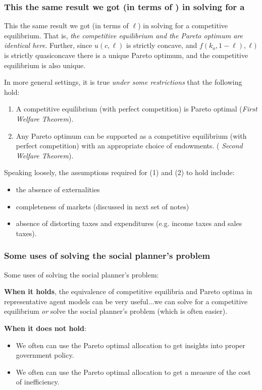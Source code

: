 \documentclass[aspectratio=169]{ltx-talk}
\begin{document}
\begin{frame}
\frametitle{This the same result we got (in terms of ) in solving for a}
This the same result we got (in terms of $\ell $) in solving for a
competitive equilibrium. That is, \textit{the competitive equilibrium and
the Pareto optimum are identical here}. Further, since $u(c,\ell )$ is
strictly concave, and $f\left( k_{o},1-\ell \right) ,\ell )$ is strictly
quasiconcave there is a unique Pareto optimum, and the competitive
equilibrium is also unique.

\noindent In more general settings, it is true \textit{under some
restrictions} that the following hold:

\begin{enumerate}
\item A competitive equilibrium (with perfect competition) is Pareto optimal
(\textit{First Welfare Theorem}).

\item Any Pareto optimum can be supported as a competitive equilibrium (with
perfect competition) with an appropriate choice of endowments. (\textit{%
Second Welfare Theorem}).
\end{enumerate}

Speaking loosely, the assumptions required for (1) and (2) to hold include:%

\par{}


\begin{itemize}
\item the absence of externalities

\item completeness of markets (discussed in next set of notes)

\item absence of distorting taxes and expenditures (e.g. income taxes and
sales taxes).
\end{itemize}
\end{frame}

\begin{frame}
\frametitle{Some uses of solving the social planner{'}s problem}
Some uses of solving the social planner's problem:

\noindent \textbf{When it holds}, the equivalence of competitive equilibria
and Pareto optima in representative agent models can be very useful...we can
solve for a competitive equilibrium \textit{or} solve the social planner's
problem (which is often easier).

\noindent \textbf{When it does not hold}:

\begin{itemize}
\item We often can use the Pareto optimal allocation to get insights into
proper government policy.

\item We often can use the Pareto optimal allocation to get a measure of the
cost of inefficiency.
\end{itemize}
\end{frame}
\end{document}
